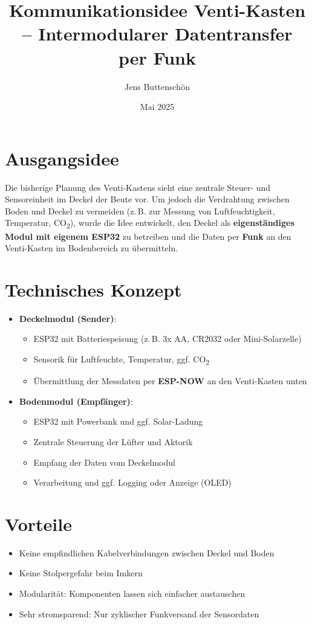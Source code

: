 \documentclass[11pt,a4paper]{article}
\title{Kommunikationsidee Venti-Kasten – Intermodularer Datentransfer per Funk}
\author{Jens Buttenschön}
\date{Mai 2025}
\begin{document}
\maketitle

\section*{Ausgangsidee}
Die bisherige Planung des Venti-Kastens sieht eine zentrale Steuer- und Sensoreinheit im Deckel der Beute vor. Um jedoch die Verdrahtung zwischen Boden und Deckel zu vermeiden (z.\,B. zur Messung von Luftfeuchtigkeit, Temperatur, CO\textsubscript{2}), wurde die Idee entwickelt, den Deckel als \textbf{eigenständiges Modul mit eigenem ESP32} zu betreiben und die Daten per \textbf{Funk} an den Venti-Kasten im Bodenbereich zu übermitteln.

\section*{Technisches Konzept}
\begin{itemize}
  \item \textbf{Deckelmodul (Sender)}: 
  \begin{itemize}
    \item ESP32 mit Batteriespeisung (z.\,B. 3x AA, CR2032 oder Mini-Solarzelle)
    \item Sensorik für Luftfeuchte, Temperatur, ggf. CO\textsubscript{2}
    \item Übermittlung der Messdaten per \textbf{ESP-NOW} an den Venti-Kasten unten
  \end{itemize}
  \item \textbf{Bodenmodul (Empfänger)}:
  \begin{itemize}
    \item ESP32 mit Powerbank und ggf. Solar-Ladung
    \item Zentrale Steuerung der Lüfter und Aktorik
    \item Empfang der Daten vom Deckelmodul
    \item Verarbeitung und ggf. Logging oder Anzeige (OLED)
  \end{itemize}
\end{itemize}

\section*{Vorteile}
\begin{itemize}
  \item Keine empfindlichen Kabelverbindungen zwischen Deckel und Boden
  \item Keine Stolpergefahr beim Imkern
  \item Modularität: Komponenten lassen sich einfacher austauschen
  \item Sehr stromsparend: Nur zyklischer Funkversand der Sensordaten
\end{itemize}
\end{document}
